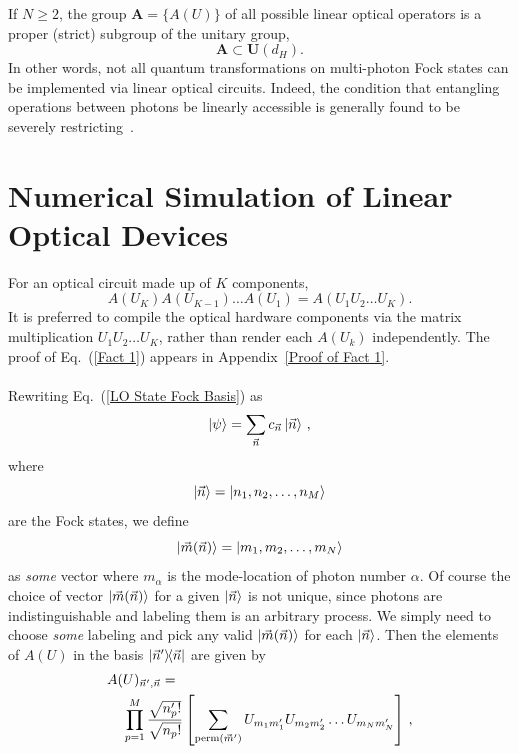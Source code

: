 \documentclass[aps,pra,twocolumn,superscriptaddress,floatfix,10pt]{revtex4}
\begin{document}
If $N \ge 2$, the group $\textbf{A}=\{ A(U) \}$  of all possible linear optical operators is a proper (strict) subgroup of the unitary group,
\begin{equation}
\label{Proper Subgroup}
\textbf{A} \subset \textbf{U}(d_H).
\end{equation}
In other words, not all quantum transformations on multi-photon Fock states can be implemented via linear optical circuits. Indeed, the condition that entangling operations between photons be linearly accessible is  generally found to be severely restricting~\cite{Matt Smith,Braunstein,Jake Smith,Lougovski,Lutkenhaus,Carollo,Pavicic}. 
\section{Numerical Simulation of Linear Optical Devices}
\label{Section on Protocol}
For an optical circuit made up of $K$ components,
\begin{equation}
	\label{Fact 1}
A(U_K) A(U_{K-1}) \dots A(U_1) = A(U_1 U_2 \dots U_K).
\end{equation}
It is preferred to compile the optical hardware components via the matrix multiplication $U_1 U_2 \dots U_K$, rather than render each $A(U_k)$ independently. The proof of Eq.~(\ref{Fact 1}) appears in Appendix~\ref{Proof of Fact 1}.
\\ \\ \indent
Rewriting Eq.~(\ref{LO State Fock Basis}) as
\begin{equation}
\label{LO State Fock Vec Basis}
\ket{\psi} = \sum_{\vec{n}} c_{\vec{n}} \ket{\vec{n}} \,,
\end{equation}
where
\begin{equation}
\ket{\vec{n}} = \ket{n_1,n_2,\dots,n_M}
\end{equation}
are the Fock states, we define
\begin{equation}
\label{m definition}
\ket{\vec{m}(\vec{n})} = \ket{m_1,m_2,\dots,m_N}
\end{equation}
as \textit{some} vector where $m_\alpha$ is the mode-location of photon number $\alpha$. Of course the choice of vector $\ket{\vec{m}(\vec{n})}$ for a given $\ket{\vec{n}}$ is not unique, since photons are indistinguishable and labeling them is an arbitrary process. We simply need to choose \textit{some} labeling and pick any valid $\ket{\vec{m}(\vec{n})}$ for each $\ket{\vec{n}}$. Then the elements of $A(U)$ in the basis $\outerproduct{\vec{n}^\prime}{\vec{n}}$ are given by
\begin{eqnarray}
\label{Fact 2}
A(U)_{\vec{n}^\prime,\vec{n}} = \quad \quad \quad \quad \quad \quad \quad \quad \quad \quad \quad \quad \quad \quad \quad \quad \quad \\ \small \nonumber \prod_{p=1}^{M} \frac{\sqrt{n_p^\prime !}}{\sqrt{n_p !}} \left[\sum_{\textrm{perm}(\vec{m}^\prime)} U_{m_1 m_1^\prime} U_{m_2 m_2^\prime} \dots U_{m_N m_N^\prime} \right] \,, 
\end{eqnarray}
\end{document}
